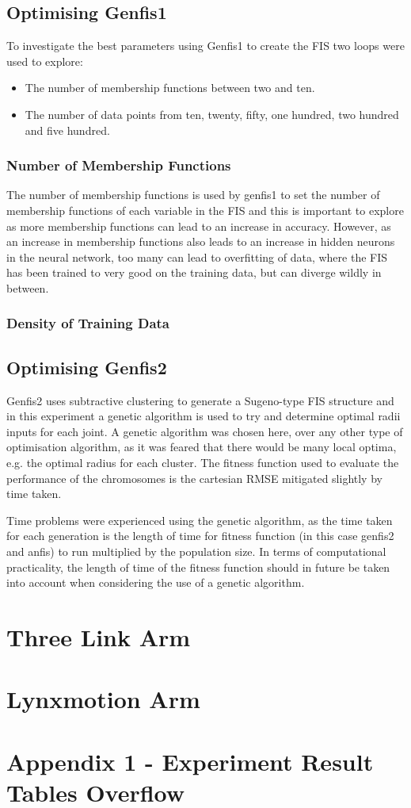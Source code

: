 \documentclass[11.5pt, twoside, a4paper]{article}
\begin{document}
\subsection{Optimising Genfis1}
To investigate the best parameters using Genfis1 to create the FIS two loops were used to explore:
\begin{itemize}
\item The number of membership functions between two and ten.
\item The number of data points from ten, twenty, fifty, one hundred, two hundred and five hundred.
\end{itemize}

\subsubsection{Number of Membership Functions}
The number of membership functions is used by genfis1 to set the number of membership functions of each variable in the FIS \cite{genfis1} and this is important to explore as more membership functions can lead to an increase in accuracy. However, as an increase in membership functions also leads to an increase in hidden neurons in the neural network, too many can lead to overfitting of data, where the FIS has been trained to very good on the training data, but can diverge wildly in between. 

\subsubsection{Density of Training Data}

\subsection{Optimising Genfis2}
Genfis2 uses subtractive clustering to generate a Sugeno-type FIS structure \cite{genfis2} and in this experiment a genetic algorithm is used to try and determine optimal radii inputs for each joint. A genetic algorithm was chosen here, over any other type of optimisation algorithm, as it was feared that there would be many local optima, e.g. the optimal radius for each cluster. The fitness function used to evaluate the performance of the chromosomes is the cartesian RMSE mitigated slightly by time taken.

Time problems were experienced using the genetic algorithm, as the time taken for each generation is the length of time for fitness function (in this case genfis2 and anfis) to run multiplied by the population size. In terms of computational practicality, the length of time of the fitness function should in future be taken into account when considering the use of a genetic algorithm. 

\section{Three Link Arm}

\section{Lynxmotion Arm}


\section{Appendix 1 - Experiment Result Tables Overflow}





{}
\end{document}

